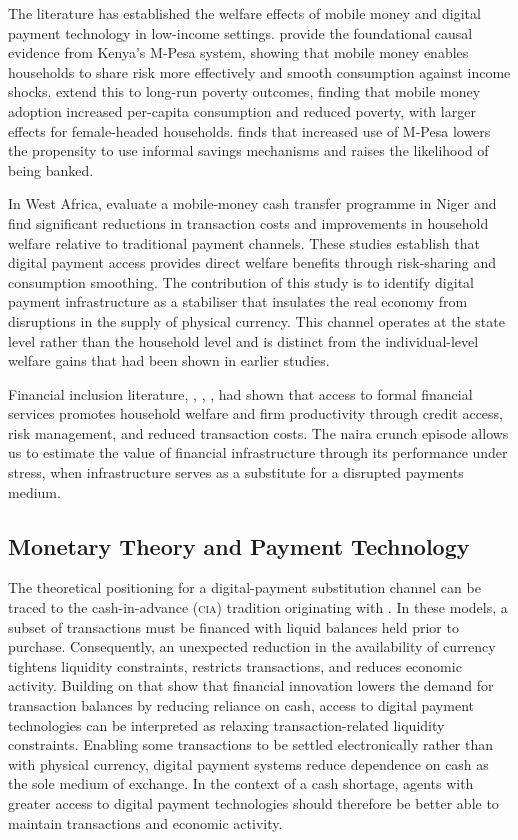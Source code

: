 The literature has established the welfare effects of mobile money and digital
payment technology in low-income settings. \citet{jack2014risk} provide the
foundational causal evidence from Kenya's M-Pesa system, showing that mobile
money enables households to share risk more effectively and smooth consumption
against income shocks. \citet{suri2016mobile} extend this to long-run poverty
outcomes, finding that mobile money adoption increased per-capita consumption
and reduced poverty, with larger effects for female-headed households.
\citet{MbitiWeil2016} finds that increased use of M-Pesa lowers the propensity to use informal savings 
mechanisms and raises the likelihood of being banked.

In West Africa, \citet{aker2016payment} evaluate a mobile-money
cash transfer programme in Niger and find significant reductions in transaction
costs and improvements in household welfare relative to traditional payment
channels. These studies establish that digital payment access provides direct
welfare benefits through risk-sharing and consumption smoothing. The
contribution of this study is to identify digital payment
infrastructure as a stabiliser that insulates the real economy
from disruptions in the supply of physical currency. This channel operates at
the state level rather than the household level and is distinct from the
individual-level welfare gains that had been shown in earlier studies.

Financial inclusion literature, \citet{beck2007finance},
\citet{allen2016foundations}, \citet{burgess2005rural}, had shown  that access
to formal financial services promotes household welfare and firm productivity
through credit access, risk management, and reduced transaction costs. The
naira crunch episode allows us to estimate the value of financial
infrastructure through its performance under stress, when infrastructure 
serves as a substitute for a disrupted payments medium.

\subsection{Monetary Theory and Payment Technology}

The theoretical positioning for a digital-payment substitution channel can be traced
to the cash-in-advance (\textsc{cia}) tradition originating with
\citet{lucas1987money}. In these models, a subset of transactions must be financed with liquid balances 
held prior to purchase. Consequently, an unexpected reduction in the availability of currency tightens 
liquidity constraints, restricts transactions, and reduces economic activity. 
Building on \citet{Alvarez2009} that show that financial innovation lowers the demand for transaction balances by reducing 
reliance on cash, access to digital payment technologies can be interpreted as relaxing transaction-related 
liquidity constraints. Enabling some transactions to be settled electronically rather than with physical currency, 
digital payment systems reduce dependence on cash as the sole medium of exchange. In the context of a cash shortage, 
agents with greater access to digital payment technologies should 
therefore be better able to maintain transactions and economic activity.

